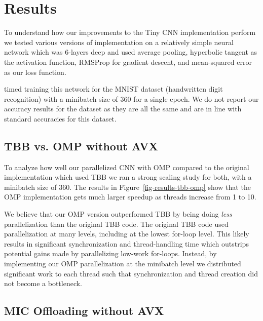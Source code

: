 

\section{Results}
\label{sec-results}


% 

To understand how our improvements to the Tiny CNN implementation perform we tested various versions of implementation on a relatively simple neural network which was 6-layers deep and used average pooling, hyperbolic tangent as the activation function, RMSProp for gradient descent, and mean-squared error as our loss function.

 timed training this network for the MNIST dataset (handwritten digit recognition) with a minibatch size of 360 for a single epoch. We do not report our accuracy results for the dataset as they are all the same and are in line with standard accuracies for this dataset.

\subsection{TBB vs. OMP without AVX}
\label{sec-results-tbb-vs-omp}


To analyze how well our parallelized CNN with OMP compared to the original implementation which used TBB we ran a strong scaling study for both, with a minibatch size of 360. The results in Figure~\ref{fig-results-tbb-omp} show that the OMP implementation gets much larger speedup as threads increase from 1 to 10.

We believe that our OMP version outperformed TBB by being doing \textit{less} parallelization than the original TBB code. The original TBB code used parallelization at many levels, including at the lowest for-loop level. This likely results in significant synchronization and thread-handling time which outstrips potential gains made by parallelizing low-work for-loops. Instead, by implementing our OMP parallelization at the minibatch level we distributed significant work to each thread such that synchronization and thread creation did not become a bottleneck.

\subsection{MIC Offloading without AVX}
\label{sec-results-mic}

